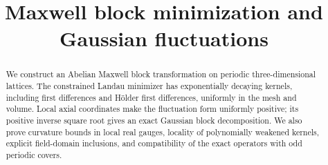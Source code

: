 \documentclass[11pt,letterpaper,reqno]{amsart}
\title[Maxwell block minimization and Gaussian fluctuations]
 {Maxwell block minimization and Gaussian fluctuations}
\date{}
\begin{document}
\begin{abstract}
We construct an Abelian Maxwell block transformation on periodic
three-dimensional lattices. The constrained Landau minimizer has
exponentially decaying kernels, including first differences and
H\"older first differences, uniformly in the mesh and volume.
Local axial coordinates make the fluctuation form uniformly positive;
its positive inverse square root gives an exact Gaussian block
decomposition. We also prove curvature bounds in local real gauges,
locality of polynomially weakened kernels, explicit field-domain
inclusions, and compatibility of the exact operators with odd
periodic covers.
\end{abstract}
\maketitle
\tableofcontents


\printbibliography
\end{document}
